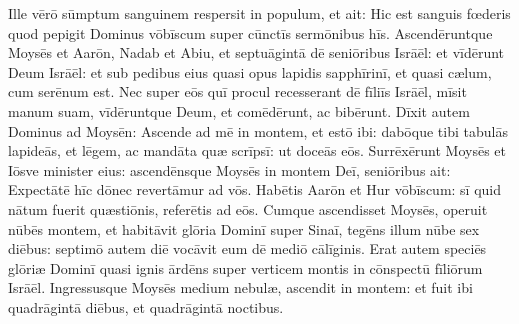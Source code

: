 Ille vērō sūmptum sanguinem
respersit in populum, et ait: Hic est sanguis fœderis quod
pepigit Dominus vōbīscum super cūnctīs sermōnibus hīs. 
Ascendēruntque Moysēs et Aarōn, Nadab et Abiu, et septuāgintā dē seniōribus
Isrāēl: 
et vīdērunt Deum Isrāēl: et sub pedibus eius quasi opus
lapidis sapphīrinī, et quasi cælum, cum serēnum est. 
Nec
super eōs quī procul recesserant dē fīliīs Isrāēl, mīsit manum suam,
vīdēruntque Deum, et comēdērunt, ac
bibērunt. 
Dīxit autem Dominus ad Moysēn: Ascende ad mē
in montem, et estō ibi: dabōque tibi tabulās lapideās, et lēgem, ac mandāta quæ scrīpsī: ut doceās eōs. 
Surrēxērunt Moysēs et Iōsve minister eius: ascendēnsque Moysēs in montem
Deī, 
seniōribus ait: Expectātē hīc dōnec revertāmur ad
vōs. Habētis Aarōn et Hur vōbīscum: sī quid nātum fuerit
quæstiōnis, referētis ad eōs. 
Cumque ascendisset Moysēs,
operuit nūbēs montem, 
et habitāvit glōria Dominī super Sinaī, tegēns
illum nūbe sex diēbus: septimō autem diē vocāvit eum dē mediō
cālīginis. 
Erat autem speciēs glōriæ Dominī quasi ignis
ārdēns super verticem montis in cōnspectū fīliōrum Isrāēl. 
Ingressusque Moysēs medium nebulæ,
ascendit in montem: et fuit ibi quadrāgintā diēbus, et quadrāgintā
noctibus.
